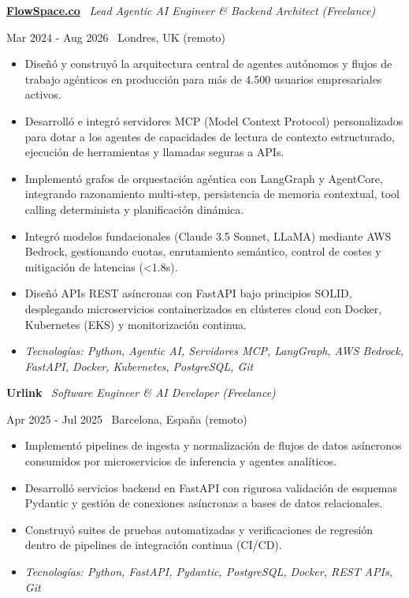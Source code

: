 \documentclass[a4paper,10pt]{article}
\newcommand{\role}[4]{%
  \vspace{2pt}\noindent
  \begin{minipage}[t]{0.70\textwidth}\raggedright\textbf{#1} \textbullet\ \textit{#3}\end{minipage}%
  \hfill
  \begin{minipage}[t]{0.28\textwidth}\raggedleft\footnotesize\color{gray}#2 \textbullet\ #4\end{minipage}%
  \vspace{1pt}%
}
\begin{document}
\role{\href{https://flowspace.co}{FlowSpace.co}}{Mar 2024 - Aug 2026}{Lead Agentic AI Engineer \& Backend Architect (Freelance)}{Londres, UK (remoto)}
\begin{itemize}
  \item Diseñó y construyó la arquitectura central de agentes autónomos y flujos de trabajo agénticos en producción para más de 4.500 usuarios empresariales activos.
  \item Desarrolló e integró servidores MCP (Model Context Protocol) personalizados para dotar a los agentes de capacidades de lectura de contexto estructurado, ejecución de herramientas y llamadas seguras a APIs.
  \item Implementó grafos de orquestación agéntica con LangGraph y AgentCore, integrando razonamiento multi-step, persistencia de memoria contextual, tool calling determinista y planificación dinámica.
  \item Integró modelos fundacionales (Claude 3.5 Sonnet, LLaMA) mediante AWS Bedrock, gestionando cuotas, enrutamiento semántico, control de costes y mitigación de latencias (<1.8s).
  \item Diseñó APIs REST asíncronas con FastAPI bajo principios SOLID, desplegando microservicios containerizados en clústeres cloud con Docker, Kubernetes (EKS) y monitorización continua.
  \item \textit{Tecnologías: Python, Agentic AI, Servidores MCP, LangGraph, AWS Bedrock, FastAPI, Docker, Kubernetes, PostgreSQL, Git}
\end{itemize}

\role{Urlink}{Apr 2025 - Jul 2025}{Software Engineer \& AI Developer (Freelance)}{Barcelona, España (remoto)}
\begin{itemize}
  \item Implementó pipelines de ingesta y normalización de flujos de datos asíncronos consumidos por microservicios de inferencia y agentes analíticos.
  \item Desarrolló servicios backend en FastAPI con rigurosa validación de esquemas Pydantic y gestión de conexiones asíncronas a bases de datos relacionales.
  \item Construyó suites de pruebas automatizadas y verificaciones de regresión dentro de pipelines de integración continua (CI/CD).
  \item \textit{Tecnologías: Python, FastAPI, Pydantic, PostgreSQL, Docker, REST APIs, Git}
\end{itemize}
\end{document}
